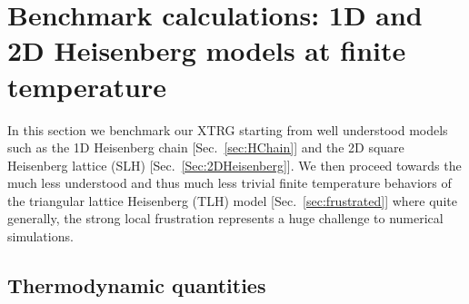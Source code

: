 \documentclass[aps,prx,twocolumn,showpacs,psfig,superscriptaddress,longbibliography]{revtex4-1}
\newcommand{\Sec}[1]{Sec.~\ref{#1}}
\begin{document}
\section{Benchmark calculations: 1D and 2D Heisenberg models at finite temperature}
\label{Sec:Bench}

 {In this section we benchmark our XTRG starting from well understood
models such as the 1D Heisenberg chain [\Sec{sec:HChain}] and the
2D square Heisenberg lattice (SLH) [\Sec{Sec:2DHeisenberg}].
We then proceed towards the much less understood and thus much less trivial
finite temperature behaviors of the triangular lattice Heisenberg (TLH) model [\Sec{sec:frustrated}] where quite generally, the strong local frustration
represents a huge challenge to numerical simulations.}

\subsection{ {Thermodynamic quantities}}
\end{document}
